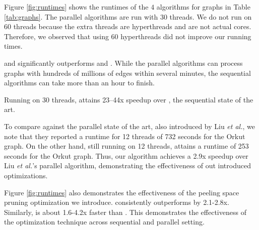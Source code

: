 
Figure \ref{fig:runtimes} shows the runtimes of the $4$ algorithms for graphs in Table \ref{tab:graphs}. The parallel algorithms are run with 30 threads. We do not run on 60 threads because the extra threads are hyperthreads and are not actual cores. Therefore, we observed that using 60 hyperthreads did not improve our running times.

 and  significantly outperforms  and . While the parallel algorithms can process graphs with hundreds of millions of edges within several minutes, the sequential algorithms can take more than an hour to finish.

Running on 30 threads,  attains 23--44x speedup over , the sequential state of the art.

To compare against the parallel state of the art, also introduced by Liu \textit{et al.}, we note that they reported a runtime for 12 threads of 732 seconds for the Orkut graph. On the other hand, still running on 12 threads,  attains a runtime of 253 seconds for the Orkut graph. Thus, our algorithm achieves a 2.9x speedup over Liu \textit{et al.}'s parallel algorithm, demonstrating the effectiveness of out introduced optimizations.


Figure \ref{fig:runtimes} also demonstrates the effectiveness of the peeling space pruning optimization we introduce.  consistently outperforms  by 2.1-2.8x. Similarly,  is about 1.6-4.2x faster than . This demonstrates the effectiveness of the optimization technique across sequential and parallel setting. 

